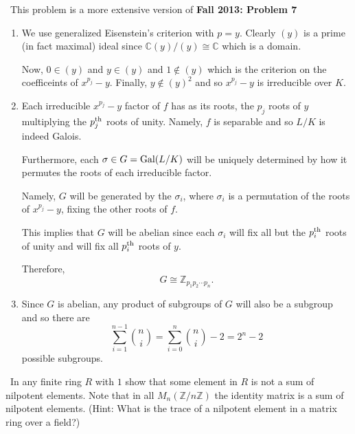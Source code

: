 \documentclass[12pt]{AlgebraQual}
\begin{document}
\begin{solution}$\,$
This problem is a more extensive version of \textbf{Fall 2013: Problem 7}
\begin{enumerate}[label=(\alph*)]
    \item We use generalized Eisenstein's criterion with $p=y$. Clearly $(y)$ is a prime (in fact maximal) ideal since $\mathbb{C}(y)/(y)\cong\mathbb{C}$ which is a domain.

    Now, $0\in(y)$ and $y\in (y)$ and $1\notin (y)$ which is the criterion on the coefficeints of $x^{p_j}-y$. Finally, $y\notin(y)^2$ and so $x^{p_j}-y$ is irreducible over $K$.

    \item Each irreducible $x^{p_j}-y$ factor of $f$ has as its roots, the $p_j$ roots of $y$ multiplying the $p_j^\text{th}$ roots of unity. Namely, $f$ is separable and so $L/K$ is indeed Galois.

    Furthermore, each $\sigma\in G=\text{Gal}(L/K)$ will be uniquely determined by how it permutes the roots of each irreducible factor.

    Namely, $G$ will be generated by the $\sigma_i$, where $\sigma_i$ is a permutation of the roots of $x^{p_j}-y$, fixing the other roots of $f.$

    This implies that $G$ will be abelian since each $\sigma_i$ will fix all but the $p_i^\text{th}$ roots of unity and will fix all $p_i^\text{th}$ roots of $y.$

    Therefore, $$G\cong\mathbb{Z}_{p_1p_2\cdots p_n}.$$

    \item Since $G$ is abelian, any product of subgroups of $G$ will also be a subgroup and so there are $$\sum_{i=1}^{n-1}\binom{n}{i}=\sum_{i=0}^n\binom{n}{i}-2=2^n-2$$ possible subgroups.
\end{enumerate}
\end{solution}
\newpage



\begin{problem} $\,$
In any finite ring $R$ with $1$ show that some element in $R$ is not a sum of nilpotent elements. Note that in all $M_n(\mathbb{Z}/n\mathbb{Z})$ the identity matrix is a sum of nilpotent elements. (Hint: What is the trace of a nilpotent element in a matrix ring over a field?)
\end{problem}
\end{document}
